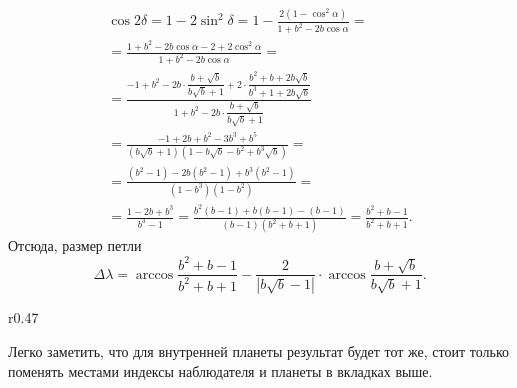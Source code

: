\begin{multline*}
    \cos 2 \delta 
        = 1 - 2 \sin^2 \delta 
        = 1 - \frac{2(1 - \cos^2 \alpha)}{1 + b^2 - 2b \cos \alpha} = \\
        =\frac{1 + b^2 - 2 b \cos \alpha - 2 + 2 \cos^2 \alpha}{1 + b^2 - 2b\cos \alpha} =\\
        = \frac{-1 + b^2 - 2b \cdot \dfrac{b + \sqrt{b}}{b \sqrt{b} + 1} + 2 \cdot \dfrac{b^2 + b +2b\sqrt{b}}{b^3 + 1 + 2 b \sqrt{b}}}{1 + b^2 - 2b \cdot \dfrac{b + \sqrt{b}}{b \sqrt{b} + 1}}\\
        = \frac{-1 + 2b + b^2 - 3b^3 + b^5}{\left(b \sqrt{b} + 1\right) \left(1 - b \sqrt{b} - b^2 + b^3 \sqrt{b}\right)} = \\
        = \frac{(b^2 - 1) - 2b(b^2 - 1) + b^3(b^2 - 1)}{(1 - b^3)(1 - b^2)} = \\
        = \frac{1 - 2b + b^3}{b^3 - 1} = \frac{b^2(b-1) + b(b-1) - (b - 1)}{\left(b-1\right)\left(b^2 + b + 1\right)} = \frac{b^2 + b - 1}{b^2 + b + 1}.
\end{multline*} 
Отсюда, размер петли
\begin{equation}
    \Delta\lambda = \arccos \frac{b^2 + b - 1}{b^2 + b + 1} - \frac{2}{\left|b\sqrt{b} - 1 \right|} \cdot \arccos \frac{b + \sqrt{b}}{b \sqrt{b} + 1}.
\end{equation}

\begin{wrapfigure}[9]{r}{0.47\tw}
	\centering
	\vspace{-1pc}
	\caption{}
\end{wrapfigure}
Легко заметить, что для внутренней планеты результат будет тот же, стоит только поменять местами индексы наблюдателя и планеты в вкладках выше. 








